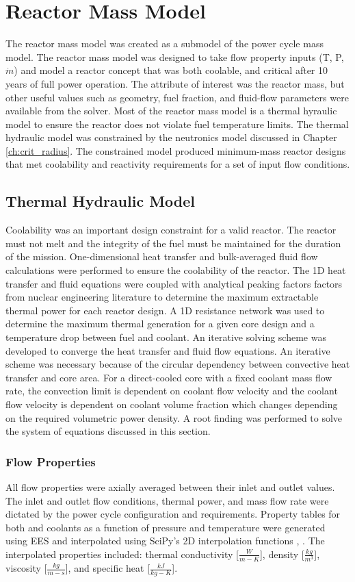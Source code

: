 \chapter{Reactor Mass Model} \label{ch:mass_model}
The reactor mass model was created as a submodel of the power cycle mass
model. The reactor mass model was designed to take flow property inputs (T, P,
$\dot{m}$) and model a reactor concept that was both coolable, and critical
after 10 years of full power operation. The attribute of interest was the 
reactor mass, but other useful values such as geometry, fuel fraction,
and fluid-flow parameters were available from the solver. Most of the reactor
mass model is a thermal hyraulic model to ensure the reactor does not violate fuel
temperature limits. The thermal hydraulic model was constrained by the
neutronics model discussed in Chapter \ref{ch:crit_radius}. The constrained
model produced minimum-mass reactor designs that met coolability and 
reactivity requirements for a set of input flow conditions.

\section{Thermal Hydraulic Model}
Coolability was an important design constraint for a valid reactor. The reactor must
not melt and the integrity of the fuel must be maintained for the duration of
the mission. One-dimensional heat transfer and bulk-averaged fluid flow calculations were
performed to ensure the coolability of the reactor. The 1D
heat transfer and fluid equations were coupled with analytical peaking factors
factors from nuclear engineering literature to determine the maximum extractable
thermal power for each reactor design. A 1D resistance network was used to
determine the maximum thermal generation for a given core design and a temperature
drop between fuel and coolant. An iterative solving scheme was developed to
converge the heat transfer and fluid flow equations. An iterative scheme was
necessary because of the circular dependency between convective heat transfer and core
area. For a direct-cooled core with a fixed coolant mass flow rate, 
the convection limit is dependent on coolant flow velocity and the
coolant flow velocity is dependent on coolant volume fraction which changes
depending on the required volumetric power density. A root finding was performed
to solve the system of equations discussed in this section.

\subsection{Flow Properties}
All flow properties were axially averaged between their inlet and outlet values.
The inlet and outlet flow conditions, thermal power, and mass flow rate were
dictated by the power cycle configuration and requirements. Property tables for
both \codiox and \water coolants as a function of pressure and temperature were 
generated using EES and interpolated using SciPy's 2D interpolation functions
\citep{scipy}, \citep{EES_citation}.
The interpolated properties included: thermal conductivity [$\frac{W}{m-K}$], density
[$\frac{kg}{m^3}$], viscosity [$\frac{kg}{m-s}$], and specific heat [$\frac{kJ}{kg-K}$].

